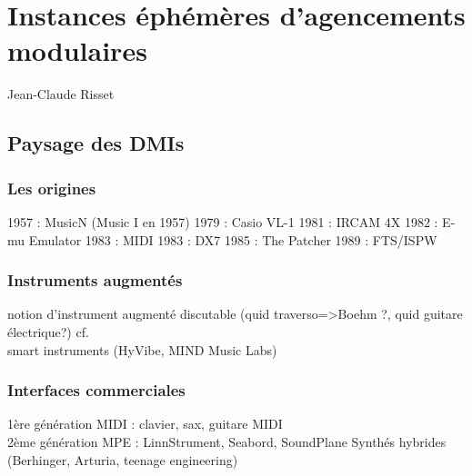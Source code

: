 %
\chapter{Instances éphémères d'agencements modulaires}
\label{ch:ephemeral}



 {Jean-Claude Risset \cite{risset_sound_2014}}


\section{Paysage des DMIs}
\label{sec:ephemerality:landscape}

\subsection{Les origines}
1957 : MusicN (Music I en 1957)
1979 : Casio VL-1
1981 : IRCAM 4X
1982 : E-mu Emulator
1983 : MIDI
1983 : DX7
1985 : The Patcher
1989 : FTS/ISPW

\subsection{Instruments augmentés}
notion d'instrument augmenté discutable (quid traverso=>Boehm ?, quid guitare électrique?) cf. \href{{sec:ephemeral:longevity_stability}}\\
smart instruments (HyVibe, MIND Music Labs)

\subsection{Interfaces commerciales}
1ère génération MIDI : clavier, sax, guitare MIDI\\
2ème génération MPE :  LinnStrument, Seabord, SoundPlane
Synthés hybrides (Berhinger, Arturia, teenage engineering)
